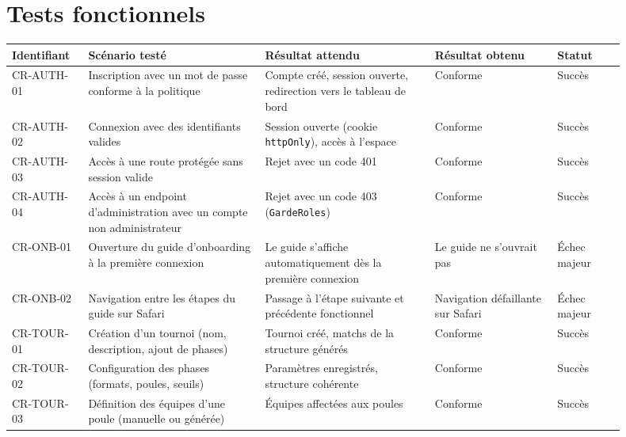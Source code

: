 {\footnotesize
\setlength{\tabcolsep}{3pt}
\renewcommand{\arraystretch}{1.12}

\section*{Tests fonctionnels}
\begin{longtable}{|>{\raggedright\arraybackslash}p{0.11\linewidth}|>{\raggedright\arraybackslash}p{0.26\linewidth}|>{\raggedright\arraybackslash}p{0.25\linewidth}|>{\raggedright\arraybackslash}p{0.18\linewidth}|>{\raggedright\arraybackslash}p{0.10\linewidth}|}
    \hline
    \textbf{Identifiant} & \textbf{Scénario testé} & \textbf{Résultat attendu} & \textbf{Résultat obtenu} & \textbf{Statut} \\
    \hline
    \endhead
    CR-AUTH-01 & Inscription avec un mot de passe conforme à la politique & Compte créé, session ouverte, redirection vers le tableau de bord & Conforme & Succès \\
    \hline
    CR-AUTH-02 & Connexion avec des identifiants valides & Session ouverte (cookie \texttt{httpOnly}), accès à l'espace & Conforme & Succès \\
    \hline
    CR-AUTH-03 & Accès à une route protégée sans session valide & Rejet avec un code 401 & Conforme & Succès \\
    \hline
    CR-AUTH-04 & Accès à un endpoint d'administration avec un compte non administrateur & Rejet avec un code 403 (\texttt{GardeRoles}) & Conforme & Succès \\
    \hline
    CR-ONB-01 & Ouverture du guide d'onboarding à la première connexion & Le guide s'affiche automatiquement dès la première connexion & Le guide ne s'ouvrait pas & Échec majeur \\
    \hline
    CR-ONB-02 & Navigation entre les étapes du guide sur Safari & Passage à l'étape suivante et précédente fonctionnel & Navigation défaillante sur Safari & Échec majeur \\
    \hline
    CR-TOUR-01 & Création d'un tournoi (nom, description, ajout de phases) & Tournoi créé, matchs de la structure générés & Conforme & Succès \\
    \hline
    CR-TOUR-02 & Configuration des phases (formats, poules, seuils) & Paramètres enregistrés, structure cohérente & Conforme & Succès \\
    \hline
    CR-TOUR-03 & Définition des équipes d'une poule (manuelle ou générée) & Équipes affectées aux poules & Conforme & Succès \\

\end{longtable}}

